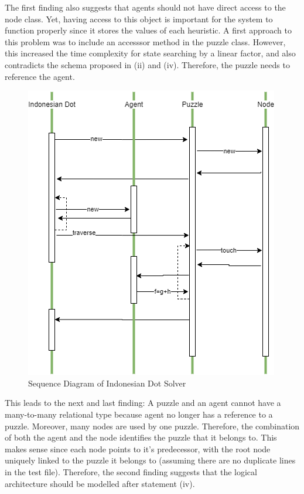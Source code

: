 The first finding also suggests that agents should not have direct access to the node class. Yet, having access to this object is important for the system to function properly since it stores the values of each heuristic. A first approach to this problem was to include an accesssor method in the puzzle class. However, this increased the time complexity for state searching by a linear factor, and also contradicts the schema proposed in (ii) and (iv). Therefore, the puzzle needs to reference the agent.\\

\begin{figure}[H]
\includegraphics[width=0.75\linewidth]{assets/functional.png}
\caption{Sequence Diagram of Indonesian Dot Solver} \label{fig1}
\end{figure}

This leads to the next and last finding: A puzzle and an agent cannot have a many-to-many relational type because agent no longer has a reference to a puzzle. Moreover, many nodes are used by one puzzle. Therefore, the combination of both the agent and the node identifies the puzzle that it belongs to. This makes sense since each node points to it's predecessor, with the root node uniquely linked to the puzzle it belongs to (assuming there are no duplicate lines in the test file). Therefore, the second finding suggests that the logical architecture should be modelled after statement (iv).\\

